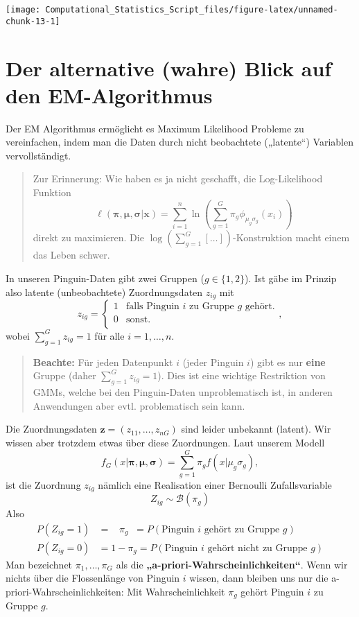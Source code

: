 \documentclass[
  ngerman,
]{book}
\begin{document}
\begin{center}\texttt{[image: Computational\_Statistics\_Script\_files/figure-latex/unnamed-chunk-13-1]} \end{center}

\hypertarget{der-alternative-wahre-blick-auf-den-em-algorithmus}{%
\section{Der alternative (wahre) Blick auf den EM-Algorithmus}\label{der-alternative-wahre-blick-auf-den-em-algorithmus}}

Der EM Algorithmus ermöglicht es Maximum Likelihood Probleme zu vereinfachen, indem man die Daten durch nicht beobachtete („latente``) Variablen vervollständigt.

\begin{quote}
Zur Erinnerung: Wie haben es ja nicht geschafft, die Log-Likelihood Funktion
\[
\ell(\boldsymbol{\pi},\boldsymbol{\mu},\boldsymbol{\sigma}|\mathbf{x})
=\sum_{i=1}^n\ln\left(\sum_{g=1}^G\pi_g\phi_{\mu_g\sigma_g}(x_i)\right)
\]
direkt zu maximieren. Die \(\log(\sum_{g=1}^G[\dots])\)-Konstruktion macht einem das Leben schwer.
\end{quote}

In unseren Pinguin-Daten gibt zwei Gruppen (\(g\in\{1,2\}\)). Ist gäbe im Prinzip also latente (unbeobachtete) Zuordnungsdaten \(z_{ig}\) mit
\[
z_{ig}=
\left\{\begin{array}{ll}
1&\text{falls Pinguin }i\text{ zu Gruppe }g\text{ gehört.}\\
0&\text{sonst.}\\
\end{array}\right.,
\]
wobei \(\sum_{g=1}^Gz_{ig}=1\) für alle \(i=1,\dots,n\).

\begin{quote}
\textbf{Beachte:} Für jeden Datenpunkt \(i\) (jeder Pinguin \(i\)) gibt es nur \textbf{eine} Gruppe (daher \(\sum_{g=1}^Gz_{ig}=1\)). Dies ist eine wichtige Restriktion von GMMs, welche bei den Pinguin-Daten unproblematisch ist, in anderen Anwendungen aber evtl. problematisch sein kann.
\end{quote}

Die Zuordnungsdaten \(\mathbf{z}=(z_{11},\dots,z_{nG})\) sind leider unbekannt (latent). Wir wissen aber trotzdem etwas über diese Zuordnungen. Laut unserem Modell
\[
f_G(x|\boldsymbol{\pi},\boldsymbol{\mu},\boldsymbol{\sigma})=\sum_{g=1}^G\pi_gf(x|\mu_g\sigma_g),
\]
ist die Zuordnung \(z_{ig}\) nämlich eine Realisation einer Bernoulli Zufallsvariable
\[
Z_{ig}\sim\mathcal{B}(\pi_g)
\]
Also
\begin{align*}
P(Z_{ig}=1)&=\;\;\;\pi_g\;\;=P(\text{Pinguin $i$ gehört zu Gruppe }g)\\
P(Z_{ig}=0)&=1-\pi_g=P(\text{Pinguin $i$ gehört nicht zu Gruppe }g)
\end{align*}
Man bezeichnet \(\pi_1,\dots,\pi_G\) als die \textbf{„a-priori-Wahrscheinlichkeiten``}. Wenn wir nichts über die Flossenlänge von Pinguin \(i\) wissen, dann bleiben uns nur die a-priori-Wahrscheinlichkeiten: Mit Wahrscheinlichkeit \(\pi_g\) gehört Pinguin \(i\) zu Gruppe \(g\).
\end{document}
